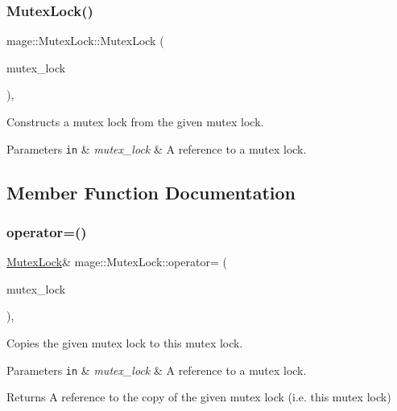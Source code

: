 \subsubsection{\texorpdfstring{Mutex\+Lock()}{MutexLock()}\hspace{0.1cm}{\footnotesize\ttfamily [2/2]}}
{\footnotesize\ttfamily mage\+::\+Mutex\+Lock\+::\+Mutex\+Lock (\begin{DoxyParamCaption}\item[{const \hyperlink{structmage_1_1_mutex_lock}{Mutex\+Lock} \&}]{mutex\+\_\+lock }\end{DoxyParamCaption})\hspace{0.3cm}{\ttfamily [private]}, {\ttfamily [delete]}}

Constructs a mutex lock from the given mutex lock.


\begin{DoxyParams}[1]{Parameters}
\mbox{\tt in}  & {\em mutex\+\_\+lock} & A reference to a mutex lock. \\
\hline
\end{DoxyParams}


\subsection{Member Function Documentation}
\hypertarget{structmage_1_1_mutex_lock_a739909161a9a9ca0fc8143ac84967765}{}\label{structmage_1_1_mutex_lock_a739909161a9a9ca0fc8143ac84967765} 
\subsubsection{\texorpdfstring{operator=()}{operator=()}}
{\footnotesize\ttfamily \hyperlink{structmage_1_1_mutex_lock}{Mutex\+Lock}\& mage\+::\+Mutex\+Lock\+::operator= (\begin{DoxyParamCaption}\item[{const \hyperlink{structmage_1_1_mutex_lock}{Mutex\+Lock} \&}]{mutex\+\_\+lock }\end{DoxyParamCaption})\hspace{0.3cm}{\ttfamily [private]}, {\ttfamily [delete]}}

Copies the given mutex lock to this mutex lock.


\begin{DoxyParams}[1]{Parameters}
\mbox{\tt in}  & {\em mutex\+\_\+lock} & A reference to a mutex lock. \\
\hline
\end{DoxyParams}
\begin{DoxyReturn}{Returns}
A reference to the copy of the given mutex lock (i.\+e. this mutex lock) 
\end{DoxyReturn}


